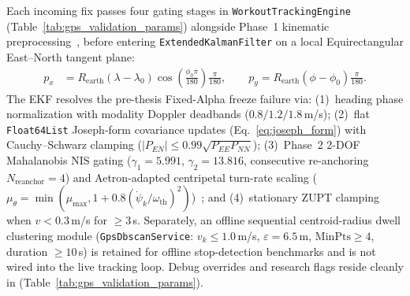Each incoming fix passes four gating stages in \texttt{WorkoutTrackingEngine} (Table~\ref{tab:gps_validation_params}) alongside Phase~1 kinematic preprocessing~\cite{zheng2015trajectory,li2025trajectory}, before entering \texttt{ExtendedKalmanFilter} on a local Equirectangular East--North tangent plane:
\begin{align}
    p_x &= R_{\text{earth}} (\lambda - \lambda_0) \cos\!\left(\frac{\phi_0\pi}{180}\right)\frac{\pi}{180}, \qquad
    p_y = R_{\text{earth}} (\phi - \phi_0)\frac{\pi}{180}.
\end{align}
The EKF resolves the pre-thesis Fixed-Alpha freeze failure via: (1)~heading phase normalization with modality Doppler deadbands ($0.8/1.2/1.8$\,m/s); (2)~flat \texttt{Float64List} Joseph-form covariance updates (Eq.~\ref{eq:joseph_form}) with Cauchy--Schwarz clamping ($|P_{EN}| \le 0.99\sqrt{P_{EE}P_{NN}}$); (3)~Phase~2 2-DOF Mahalanobis NIS gating ($\gamma_1 = 5.991$, $\gamma_2 = 13.816$, consecutive re-anchoring $N_{\text{reanchor}}=4$) and Aetron-adapted centripetal turn-rate scaling ($\mu_\theta = \min(\mu_{\max}, 1 + 0.8(\dot{\psi}_k/\omega_{\text{th}})^2)$)~\cite{groves2013principles,rongli2003survey,sukhenko2025gnss}; and (4)~stationary ZUPT clamping when $v < 0.3$\,m/s for $\ge 3$\,s. Separately, an offline sequential centroid-radius dwell clustering module (\texttt{GpsDbscanService}: $v_k \le 1.0$\,m/s, $\varepsilon = 6.5$\,m, $\mathrm{MinPts} \ge 4$, duration $\ge 10$\,s) is retained for offline stop-detection benchmarks and is not wired into the live tracking loop. Debug overrides and research flags reside cleanly in  (Table~\ref{tab:gps_validation_params}).

